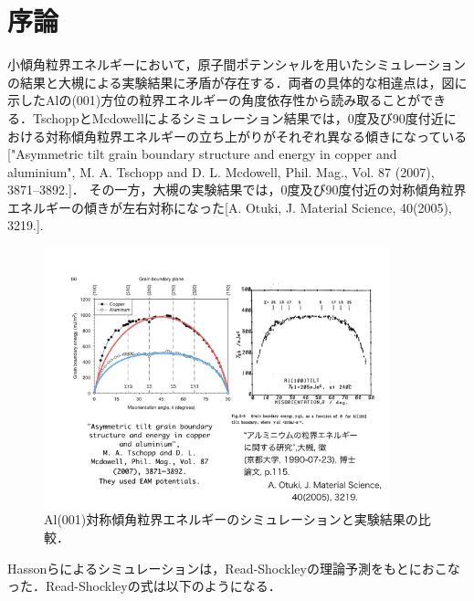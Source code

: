 
\section{序論}
小傾角粒界エネルギーにおいて，原子間ポテンシャルを用いたシミュレーションの結果と大槻による実験結果に矛盾が存在する．両者の具体的な相違点は，図に示したAlの(001)方位の粒界エネルギーの角度依存性から読み取ることができる．TschoppとMcdowellによるシミュレーション結果では，0度及び90度付近における対称傾角粒界エネルギーの立ち上がりがそれぞれ異なる傾きになっている["Asymmetric tilt grain boundary structure and energy in copper and aluminium", M. A. Tschopp and D. L. Mcdowell, Phil. Mag., Vol. 87 (2007), 3871–3892.]．
その一方，大槻の実験結果では，0度及び90度付近の対称傾角粒界エネルギーの傾きが左右対称になった[A. Otuki, J. Material Science, 40(2005), 3219.].

\begin{figure}[htbp]\begin{center}
\includegraphics[width=10cm,bb= 0 0 737 553]{../figs/./boundary_narita.002.jpeg}
\caption{Al(001)対称傾角粒界エネルギーのシミュレーションと実験結果の比較．}
\label{default}\end{center}\end{figure}
Hassonらによるシミュレーションは，Read-Shockleyの理論予測をもとにおこなった．Read-Shockleyの式は以下のようになる．

